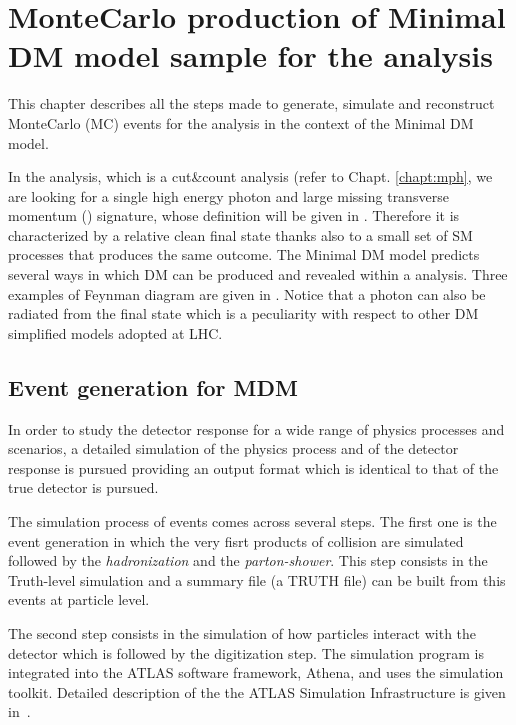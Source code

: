 \chapter[MonteCarlo sample production]{MonteCarlo production of Minimal DM model sample for the \mph analysis}

\lettrine{T}{}his chapter describes all the steps made to generate, simulate and reconstruct MonteCarlo (MC) events for the \mph analysis in the context of the Minimal DM model.

In the \mph analysis, which is a cut\&count analysis (refer to Chapt. \ref{chapt:mph}, we are looking for a single high energy photon and large missing transverse momentum (\met) signature, whose definition will be given in \Sect{\ref{sec:recoreal}}. Therefore it is characterized by a relative clean final state thanks also to a small set of SM processes that produces the same outcome. The Minimal DM model predicts several ways in which DM can be produced and revealed within a \mph analysis. Three examples of Feynman diagram are given in \Fig{\ref{fig:feynman}}. Notice that a photon can also be radiated from the final state which is a peculiarity with respect to other DM simplified models adopted at LHC.



\section{Event generation for MDM}
In order to study the detector response for a wide range of physics processes and scenarios, a detailed simulation  of the physics process and of the detector response is pursued providing an output format which is identical to that of the true detector is pursued. 

The simulation process of events comes across several steps. The first one is the event generation in which the very fisrt products of \pp collision are simulated followed by the \emph{hadronization} and the \emph{parton-shower}. This step consists in the Truth-level simulation and a summary file (a TRUTH file) can be built from this events at particle level.

The second step consists in the simulation of how particles interact with the detector which is followed by the digitization step. The simulation program is integrated into the ATLAS software framework, Athena, and uses the \geant \cite{geant4} simulation toolkit. Detailed description of the the ATLAS Simulation Infrastructure is given in~\cite{simulation}.

